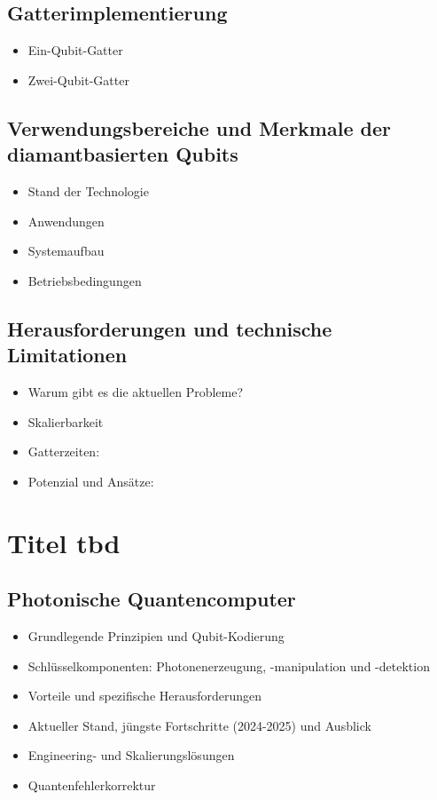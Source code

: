\subsection{Gatterimplementierung}
    \begin{itemize}
        \item Ein-Qubit-Gatter
        \item Zwei-Qubit-Gatter
    \end{itemize}
\subsection{Verwendungsbereiche und Merkmale der diamantbasierten Qubits}
    \begin{itemize}
        \item Stand der Technologie
        \item Anwendungen
        \item Systemaufbau
        \item Betriebsbedingungen
    \end{itemize}
\subsection{Herausforderungen und technische Limitationen}
    \begin{itemize}
        \item Warum gibt es die aktuellen Probleme?
        \item Skalierbarkeit
        \item Gatterzeiten:
        \item Potenzial und Ansätze:
    \end{itemize}



\section{Titel tbd}
\subsection{Photonische Quantencomputer}
    \begin{itemize}
        \item Grundlegende Prinzipien und Qubit-Kodierung
        \item Schlüsselkomponenten: Photonenerzeugung, -manipulation und -detektion
        \item Vorteile und spezifische Herausforderungen
        \item Aktueller Stand, jüngste Fortschritte (2024-2025) und Ausblick
        \item Engineering- und Skalierungslösungen
        \item Quantenfehlerkorrektur
    \end{itemize}

